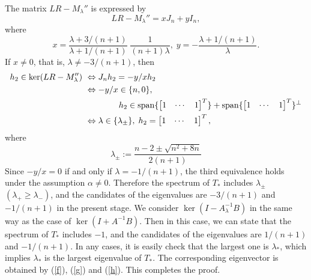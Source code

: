 \documentclass[a4paper,12pt]{article}
\newcommand{\spann}{{\rm span}}
\numberwithin{equation}{section}
\begin{document}
The matrix $LR-M_\lambda''$ is expressed by 
	\[ LR-M_\lambda''= x J_n + yI_n, \]
where 
	\[ x=\frac{\lambda+3/(n+1)}{\lambda+1/(n+1)}\; \frac{1}{(n+1)\lambda},\;y=-\frac{\lambda+1/(n+1)}{\lambda}. \] 
If $x\neq 0$, that is, $\lambda\neq -3/(n+1)$, then 
\begin{align}\label{h}
        h_2\in \ker(LR-M_\lambda'') \notag \ 
        	&\Leftrightarrow J_n h_2=-y/x h_2 \notag \\
                &\Leftrightarrow -y/x\in \{n,0\}, \notag \\
                &\qquad\qquad h_2\in \spann \{ \begin{bmatrix} 1 & \cdots & 1 \end{bmatrix}^T \}+ \spann \{ \begin{bmatrix} 1 & \cdots & 1 \end{bmatrix}^T \}^{\perp} \notag \\
                &\Leftrightarrow \lambda\in \{\lambda_{\pm}\}, \;h_2= \begin{bmatrix} 1 & \cdots & 1 \end{bmatrix}^T, 
\end{align}
where 
	\[\lambda_{\pm}:=\frac{n-2\pm \sqrt{n^2+8n}}{2(n+1)}\]
Since $-y/x=0$ if and only if $\lambda=-1/(n+1)$, the third equivalence holds under the assumption $\alpha\neq 0$.  
Therefore the spectrum of $T_\ast$ includes $\lambda_{\pm}$ $(\lambda_+\geq \lambda_-)$, and 
the candidates of the eigenvalues are $-3/(n+1)$ and $-1/(n+1)$ in the present stage. 
We consider $\ker(I-A_\lambda^{-1}B)$ in the same way as the case of $\ker(I+A^{-1}B)$. 
Then in this case, we can state that the spectrum of $T_\ast$ includes $-1$, and 
the candidates of the eigenvalues are $1/(n+1)$ and $-1/(n+1)$. 
In any cases, it is easily check that the largest one is $\lambda_\ast$, which implies $\lambda_\ast$ is the largest eigenvalue of $T_\ast$. 
The corresponding eigenvector is obtained by (\ref{f}), (\ref{g}) and (\ref{h}). 
This completes the proof.

\end{document}
